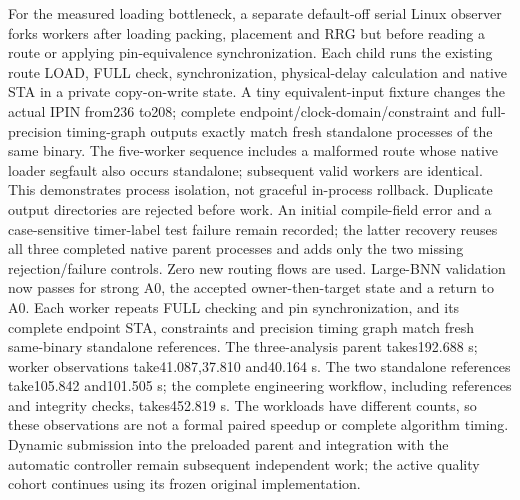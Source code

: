 For the measured loading bottleneck, a separate default-off serial Linux observer forks workers after loading packing, placement and RRG but before reading a route or applying pin-equivalence synchronization. Each child runs the existing route LOAD, FULL check, synchronization, physical-delay calculation and native STA in a private copy-on-write state. A tiny equivalent-input fixture changes the actual IPIN from236 to208; complete endpoint/clock-domain/constraint and full-precision timing-graph outputs exactly match fresh standalone processes of the same binary. The five-worker sequence includes a malformed route whose native loader segfault also occurs standalone; subsequent valid workers are identical. This demonstrates process isolation, not graceful in-process rollback. Duplicate output directories are rejected before work. An initial compile-field error and a case-sensitive timer-label test failure remain recorded; the latter recovery reuses all three completed native parent processes and adds only the two missing rejection/failure controls. Zero new routing flows are used. Large-BNN validation now passes for strong A0, the accepted owner-then-target state and a return to A0. Each worker repeats FULL checking and pin synchronization, and its complete endpoint STA, constraints and precision timing graph match fresh same-binary standalone references. The three-analysis parent takes192.688 s; worker observations take41.087,37.810 and40.164 s. The two standalone references take105.842 and101.505 s; the complete engineering workflow, including references and integrity checks, takes452.819 s. The workloads have different counts, so these observations are not a formal paired speedup or complete algorithm timing. Dynamic submission into the preloaded parent and integration with the automatic controller remain subsequent independent work; the active quality cohort continues using its frozen original implementation.
